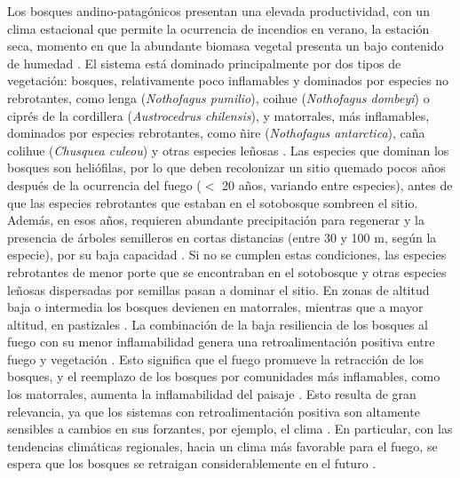 Los bosques andino-patagónicos presentan una elevada productividad, con un clima estacional que permite la ocurrencia de incendios en verano, la estación seca, momento en que la abundante biomasa vegetal presenta un bajo contenido de humedad \citep{veblen_fire_2003, veblen_historical_2008, kitzberger_firevegetation_2016}. El sistema está dominado principalmente por dos tipos de vegetación: bosques, relativamente poco inflamables y dominados por especies no rebrotantes, como lenga (\textit{Nothofagus pumilio}), coihue (\textit{Nothofagus dombeyi}) o ciprés de la cordillera (\textit{Austrocedrus chilensis}), y matorrales, más inflamables, dominados por especies rebrotantes, como ñire (\textit{Nothofagus antarctica}), caña colihue (\textit{Chusquea culeou}) y otras especies leñosas \citep{veblen_fire_2003}. Las especies que dominan los bosques son heliófilas, por lo que deben recolonizar un sitio quemado pocos años después de la ocurrencia del fuego ($<$ 20 años, variando entre especies), antes de que las especies rebrotantes que estaban en el sotobosque sombreen el sitio. Además, en esos años, requieren abundante precipitación para regenerar y la presencia de árboles semilleros en cortas distancias (entre 30 y 100 m, según la especie), por su baja capacidad \citep{cuevas_tree_2000, kitzberger_effects_2005, tercero-bucardo_field_2007, landesmann_importance_2018, landesmann_increased_2021}. Si no se cumplen estas condiciones, las especies rebrotantes de menor porte que se encontraban en el sotobosque y otras especies leñosas dispersadas por semillas pasan a dominar el sitio. En zonas de altitud baja o intermedia los bosques devienen en matorrales, mientras que a mayor altitud, en pastizales \citep{kitzberger_firevegetation_2016}. La combinación de la baja resiliencia de los bosques al fuego con su menor inflamabilidad genera una retroalimentación positiva entre fuego y vegetación \citep{kitzberger_decreases_2012, tepley_influences_2018}. Esto significa que el fuego promueve la retracción de los bosques, y el reemplazo de los bosques por comunidades más inflamables, como los matorrales, aumenta la  inflamabilidad del paisaje \citep{kitzberger_firevegetation_2016, tiribelli_non-additive_2019}. Esto resulta de gran relevancia, ya que los sistemas con retroalimentación positiva son altamente sensibles a cambios en sus forzantes, por ejemplo, el clima \citep{scheffer_alternative_2009, tepley_influences_2018}. En particular, con las tendencias climáticas regionales, hacia un clima más favorable para el fuego, se espera que los bosques se retraigan considerablemente en el futuro \citep{lloret2005fire, perry_explaining_2012, tepley_influences_2018, kitzberger_projections_2022}. 

